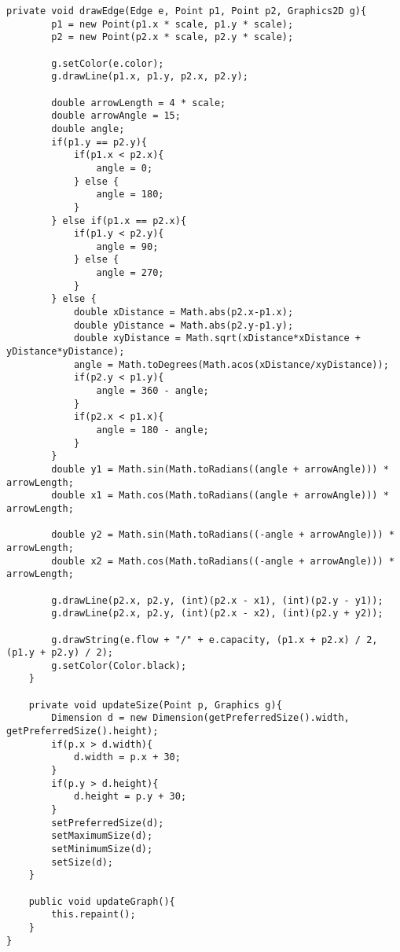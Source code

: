 \begin{lstlisting}[caption=GraphView Source Code]
	private void drawEdge(Edge e, Point p1, Point p2, Graphics2D g){
		p1 = new Point(p1.x * scale, p1.y * scale);
		p2 = new Point(p2.x * scale, p2.y * scale);
		
		g.setColor(e.color);
		g.drawLine(p1.x, p1.y, p2.x, p2.y);
		
		double arrowLength = 4 * scale;
		double arrowAngle = 15;
		double angle;
		if(p1.y == p2.y){
			if(p1.x < p2.x){
				angle = 0;
			} else {
				angle = 180;
			}
		} else if(p1.x == p2.x){
			if(p1.y < p2.y){
				angle = 90;
			} else {
				angle = 270;
			}
		} else {
			double xDistance = Math.abs(p2.x-p1.x);
			double yDistance = Math.abs(p2.y-p1.y);
			double xyDistance = Math.sqrt(xDistance*xDistance + yDistance*yDistance);
			angle = Math.toDegrees(Math.acos(xDistance/xyDistance));
			if(p2.y < p1.y){
				angle = 360 - angle;
			}
			if(p2.x < p1.x){
				angle = 180 - angle;
			}
		}
		double y1 = Math.sin(Math.toRadians((angle + arrowAngle))) * arrowLength;
		double x1 = Math.cos(Math.toRadians((angle + arrowAngle))) * arrowLength;
		
		double y2 = Math.sin(Math.toRadians((-angle + arrowAngle))) * arrowLength;
		double x2 = Math.cos(Math.toRadians((-angle + arrowAngle))) * arrowLength;
		
		g.drawLine(p2.x, p2.y, (int)(p2.x - x1), (int)(p2.y - y1));
		g.drawLine(p2.x, p2.y, (int)(p2.x - x2), (int)(p2.y + y2));
		
		g.drawString(e.flow + "/" + e.capacity, (p1.x + p2.x) / 2, (p1.y + p2.y) / 2);
		g.setColor(Color.black);
	}
	
	private void updateSize(Point p, Graphics g){
		Dimension d = new Dimension(getPreferredSize().width, getPreferredSize().height);
		if(p.x > d.width){
			d.width = p.x + 30;
		}
		if(p.y > d.height){
			d.height = p.y + 30;		
		}
		setPreferredSize(d);
		setMaximumSize(d);
		setMinimumSize(d);
		setSize(d);
	}
	
	public void updateGraph(){
		this.repaint();
	}
}
\end{lstlisting}